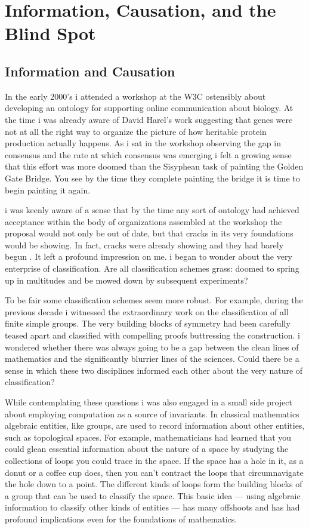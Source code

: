 \chapter{Information, Causation, and the Blind Spot}
\label{chap:pledge-ch2}

\section{Information and Causation}
\label{sec:pledge-iv}

In the early 2000's i attended a workshop at the W3C ostensibly about developing an ontology for supporting online communication about biology. At the time i was already aware of David Harel's work suggesting that genes were not at all the right way to organize the picture of how heritable protein production actually happens. As i sat in the workshop observing the gap in consensus and the rate at which consensus was emerging i felt a growing sense that this effort was more doomed than the Sisyphean task of painting the Golden Gate Bridge. You see by the time they complete painting the bridge it is time to begin painting it again.

i was keenly aware of a sense that by the time any sort of ontology had achieved acceptance within the body of organizations assembled at the workshop the proposal would not only be out of date, but that cracks in its very foundations would be showing. In fact, cracks were already showing and they had barely begun . It left a profound impression on me. i began to wonder about the very enterprise of classification. Are all classification schemes grass: doomed to spring up in multitudes and be mowed down by subsequent experiments?

To be fair some classification schemes seem more robust. For example, during the previous decade i witnessed the extraordinary work on the classification of all finite simple groups. The very building blocks of symmetry had been carefully teased apart and classified with compelling proofs buttressing the construction. i wondered whether there was always going to be a gap between the clean lines of mathematics and the significantly blurrier lines of the sciences. Could there be a sense in which these two disciplines informed each other about the very nature of classification?

While contemplating these questions i was also engaged in a small side project about employing computation as a source of invariants. In classical mathematics algebraic entities, like groups, are used to record information about other entities, such as topological spaces. For example, mathematicians had learned that you could glean essential information about the nature of a space by studying the collections of loops you could trace in the space. If the space has a hole in it, as a donut or a coffee cup does, then you can't contract the loops that circumnavigate the hole down to a point. The different kinds of loops form the building blocks of a group that can be used to classify the space. This basic idea --- using algebraic information to classify other kinds of entities --- has many offshoots and has had profound implications even for the foundations of mathematics.

